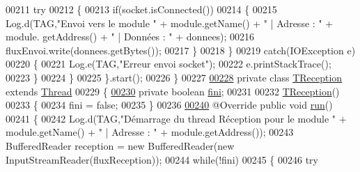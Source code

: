 \begin{DoxyCode}
00211                 \textcolor{keywordflow}{try}
00212                 \{
00213                     \textcolor{keywordflow}{if}(socket.isConnected())
00214                     \{
00215                         Log.d(TAG,\textcolor{stringliteral}{"Envoi vers le module "} + module.getName() + \textcolor{stringliteral}{" | Adresse : "} + module.
      getAddress() + \textcolor{stringliteral}{" | Données : "} + donnees);
00216                         fluxEnvoi.write(donnees.getBytes());
00217                     \}
00218                 \}
00219                 \textcolor{keywordflow}{catch}(IOException e)
00220                 \{
00221                     Log.e(TAG,\textcolor{stringliteral}{"Erreur envoi socket"});
00222                     e.printStackTrace();
00223                 \}
00224             \}
00225         \}.start();
00226     \}
00227 
\hyperlink{classcom_1_1example_1_1area_1_1_liaison_bluetooth_1_1_t_reception}{00228}     \textcolor{keyword}{private} \textcolor{keyword}{class }\hyperlink{classcom_1_1example_1_1area_1_1_liaison_bluetooth_1_1_t_reception}{TReception} \textcolor{keyword}{extends} \hyperlink{class_thread}{Thread}
00229     \{
\hyperlink{classcom_1_1example_1_1area_1_1_liaison_bluetooth_1_1_t_reception_a7f942e7af3e97af754f2591d2bd20435}{00230}         \textcolor{keyword}{private} \textcolor{keywordtype}{boolean} \hyperlink{classcom_1_1example_1_1area_1_1_liaison_bluetooth_1_1_t_reception_a7f942e7af3e97af754f2591d2bd20435}{fini};
00231 
00232         \hyperlink{classcom_1_1example_1_1area_1_1_liaison_bluetooth_1_1_t_reception}{TReception}()
00233         \{
00234           fini = \textcolor{keyword}{false};
00235         \}
00236 
\hyperlink{classcom_1_1example_1_1area_1_1_liaison_bluetooth_1_1_t_reception_afb141736dac915d0c82f96f75033f318}{00240}         @Override \textcolor{keyword}{public} \textcolor{keywordtype}{void} \hyperlink{classcom_1_1example_1_1area_1_1_liaison_bluetooth_1_1_t_reception_afb141736dac915d0c82f96f75033f318}{run}()
00241         \{
00242             Log.d(TAG,\textcolor{stringliteral}{"Démarrage du thread Réception pour le module "} + module.getName() + \textcolor{stringliteral}{" | Adresse : "} 
      + module.getAddress());
00243             BufferedReader reception = \textcolor{keyword}{new} BufferedReader(\textcolor{keyword}{new} InputStreamReader(fluxReception));
00244             \textcolor{keywordflow}{while}(!fini)
00245             \{
00246                 \textcolor{keywordflow}{try}

\end{DoxyCode}
